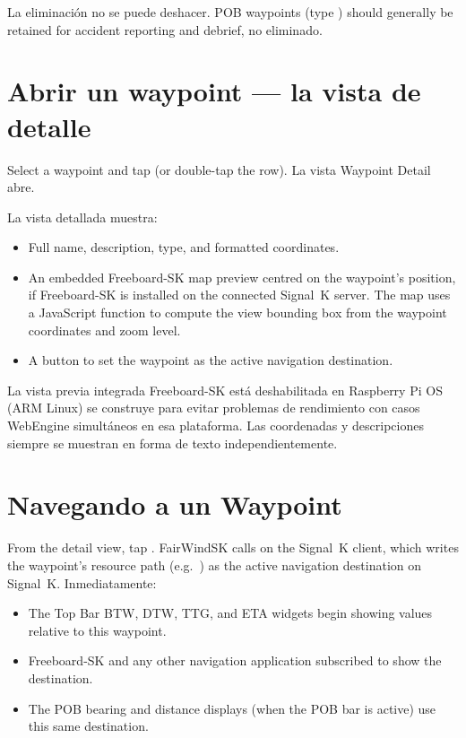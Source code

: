\begin{warningbox}
La eliminación no se puede deshacer.
POB waypoints (type ) should generally be retained for accident reporting and debrief,
no eliminado.
\end{warningbox}

\section{Abrir un waypoint --- la vista de detalle}

Select a waypoint and tap  (or double-tap the row).
La vista Waypoint Detail abre.


La vista detallada muestra:

\begin{itemize}
  \item Full name, description, type, and formatted coordinates.
  \item An embedded Freeboard-SK map preview centred on the waypoint's position, if Freeboard-SK is installed on the connected Signal~K server. The map uses a JavaScript function to compute the view bounding box from the waypoint coordinates and zoom level.
  \item A  button to set the waypoint as the active navigation destination.
\end{itemize}

\begin{notebox}
La vista previa integrada Freeboard-SK está deshabilitada en Raspberry Pi OS (ARM Linux) se construye para evitar
problemas de rendimiento con casos WebEngine simultáneos en esa plataforma.
Las coordenadas y descripciones siempre se muestran en forma de texto independientemente.
\end{notebox}

\section{Navegando a un Waypoint}

From the detail view, tap .
FairWindSK calls  on the Signal~K client, which writes the waypoint's
resource path (e.g.\ ) as the active navigation destination on
Signal~K.
Inmediatamente:

\begin{itemize}
  \item The Top Bar BTW, DTW, TTG, and ETA widgets begin showing values relative to this waypoint.
  \item Freeboard-SK and any other navigation application subscribed to  show the destination.
  \item The POB bearing and distance displays (when the POB bar is active) use this same destination.
\end{itemize}

